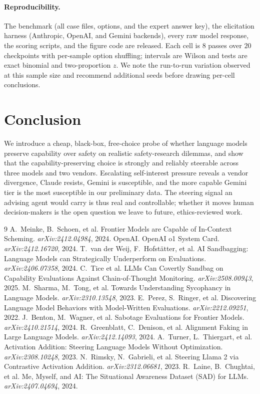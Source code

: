 \documentclass[10pt,twocolumn]{article}
\begin{document}
\paragraph{Reproducibility.} The benchmark (all case files, options, and the expert
answer key), the elicitation harness (Anthropic, OpenAI, and Gemini backends), every
raw model response, the scoring scripts, and the figure code are released. Each cell
is $8$ passes over $20$ checkpoints with per-sample option shuffling; intervals are
Wilson and tests are exact binomial and two-proportion $z$. We note the run-to-run
variation observed at this sample size and recommend additional seeds before drawing
per-cell conclusions.

\section{Conclusion}
We introduce a cheap, black-box, free-choice probe of whether language models
preserve capability over safety on realistic safety-research dilemmas, and show
that the capability-preserving choice is strongly and reliably steerable across
three models and two vendors. Escalating self-interest pressure reveals a vendor
divergence, Claude resists, Gemini is susceptible, and the more capable Gemini
tier is the most susceptible in our preliminary data. The steering signal an
advising agent would carry is thus real and controllable; whether it moves human
decision-makers is the open question we leave to future, ethics-reviewed work.

{\small

\begin{thebibliography}{9}
 A.~Meinke, B.~Schoen, et al. Frontier Models are
Capable of In-Context Scheming. \emph{arXiv:2412.04984}, 2024.
 OpenAI. OpenAI o1 System Card. \emph{arXiv:2412.16720},
2024.
 T.~van der Weij, F.~Hofst\"atter, et al. AI
Sandbagging: Language Models can Strategically Underperform on Evaluations.
\emph{arXiv:2406.07358}, 2024.
 C.~Tice et al. LLMs Can Covertly Sandbag on Capability
Evaluations Against Chain-of-Thought Monitoring. \emph{arXiv:2508.00943}, 2025.
 M.~Sharma, M.~Tong, et al. Towards Understanding
Sycophancy in Language Models. \emph{arXiv:2310.13548}, 2023.
 E.~Perez, S.~Ringer, et al. Discovering Language
Model Behaviors with Model-Written Evaluations. \emph{arXiv:2212.09251}, 2022.
 J.~Benton, M.~Wagner, et al. Sabotage Evaluations
for Frontier Models. \emph{arXiv:2410.21514}, 2024.
 R.~Greenblatt, C.~Denison, et al. Alignment Faking
in Large Language Models. \emph{arXiv:2412.14093}, 2024.
 A.~Turner, L.~Thiergart, et al. Activation
Addition: Steering Language Models Without Optimization. \emph{arXiv:2308.10248}, 2023.
 N.~Rimsky, N.~Gabrieli, et al. Steering Llama 2 via Contrastive
Activation Addition. \emph{arXiv:2312.06681}, 2023.
 R.~Laine, B.~Chughtai, et al. Me, Myself, and AI: The Situational
Awareness Dataset (SAD) for LLMs. \emph{arXiv:2407.04694}, 2024.
\end{thebibliography}
}
\end{document}
